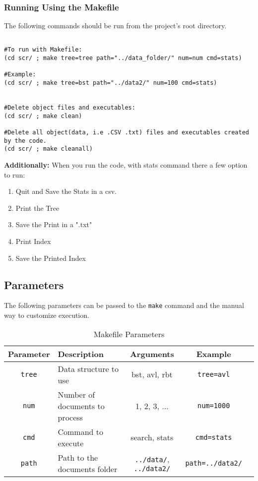 \subsubsection{Running Using the Makefile}

The following commands should be run from the project's root directory.
    
    \begin{verbatim}
    
#To run with Makefile:
(cd scr/ ; make tree=tree path="../data_folder/" num=num cmd=stats)

#Example:
(cd scr/ ; make tree=bst path="../data2/" num=100 cmd=stats)


#Delete object files and executables: 
(cd scr/ ; make clean)

#Delete all object(data, i.e .CSV .txt) files and executables created by the code.
(cd scr/ ; make cleanall)
    \end{verbatim}

\textbf{Additionally:} When you run the code, with stats command there a few option to run:

\begin{enumerate}
    \item Quit and Save the Stats in a csv.
    \item Print the Tree
    \item Save the Print in a ".txt"
    \item Print Index 
    \item Save the Printed Index
\end{enumerate}


\subsection{Parameters}
The following parameters can be passed to the \texttt{make} command and the manual way to customize execution.

\begin{table}[H]
\centering
\renewcommand{\arraystretch}{1.3}
\begin{tabular}{|c|>{\centering\arraybackslash}p{6cm}|c|c|c|} 
\hline
\textbf{Parameter} & \textbf{Description} & \textbf{Arguments} & \textbf{Example} \\
\hline
\texttt{tree} & Data structure to use & bst, avl, rbt & \texttt{tree=avl} \\
\texttt{num} & Number of documents to process & 1, 2, 3, ... & \texttt{num=1000} \\
\texttt{cmd} & Command to execute & search, stats & \texttt{cmd=stats} \\
\texttt{path} & Path to the documents folder & \texttt{../data/}, \texttt{../data2/} & \texttt{path=../data2/} \\
\hline
\end{tabular}
\caption{Makefile Parameters}
\label{tab:config_params}
\end{table}

